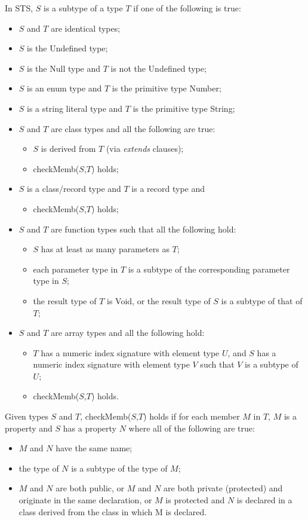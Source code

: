 In STS, $S$ is a subtype of a type $T$ if one of the following is true:
\begin{itemize}
\item $S$ and $T$ are identical types;
\item $S$ is the Undefined type;
\item $S$ is the Null type and $T$ is not the Undefined type;
\item $S$ is an enum type and $T$ is the primitive type Number;
\item $S$ is a string literal type and $T$ is the primitive type String;
\item $S$ and $T$ are class types and all the following are true:
\begin{itemize}
  \item $S$ is derived from $T$ (via \emph{extends} clauses);
  \item checkMemb($S$,$T$) holds;
\end{itemize}
\item $S$ is a class/record type and $T$ is a record type and
\begin{itemize}
  \item checkMemb($S$,$T$) holds;
\end{itemize}
\item $S$ and $T$ are function types such that all the following hold:
\begin{itemize}
  \item $S$ has at least as many parameters as $T$;
  \item each parameter type in $T$ is a subtype of the corresponding parameter type in $S$;
  \item the result type of $T$ is Void, or the result type of $S$ is a subtype of that of $T$;
\end{itemize}
\item $S$ and $T$ are array types and all the following hold:
\begin{itemize}
\item $T$ has a numeric index signature with element type $U$, 
    and $S$ has a numeric index signature with element type $V$
    such that $V$ is a subtype of $U$;
\item checkMemb($S$,$T$) holds.
\end{itemize}
\end{itemize}


Given types $S$ and $T$, checkMemb($S$,$T$) holds if for each member $M$ in $T$, 
$M$ is a property and $S$ has a property $N$ where all of the following are true:
\begin{itemize}
\item $M$ and $N$ have the same name;
\item the type of $N$ is a subtype of the type of $M$;
\item $M$ and $N$ are both public, or $M$ and $N$ are both 
      private (protected) and originate in the same declaration, 
      or $M$ is protected and $N$ is declared in a class derived from 
      the class in which M is declared.
\end{itemize}

